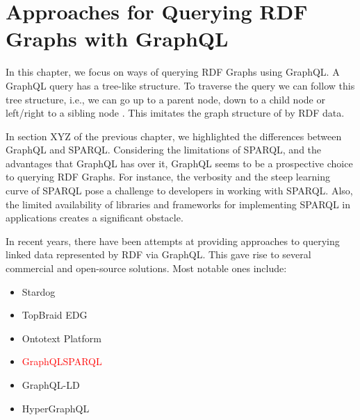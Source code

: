 \chapter{Approaches for Querying RDF Graphs with GraphQL}

In this chapter, we focus on ways of querying RDF Graphs using GraphQL. A GraphQL query has a tree-like structure. To traverse the query we can follow this tree structure, i.e., we can go up to a parent node, down to a child node or left/right to a sibling node \cite{Perez2009}. This imitates the graph structure of by RDF data.

In section XYZ of the previous chapter, we highlighted the differences between GraphQL and SPARQL. Considering the limitations of SPARQL, and the advantages that GraphQL has over it, GraphQL seems to be a prospective choice to querying RDF Graphs. For instance, the verbosity and the steep learning curve of SPARQL pose a challenge to developers in working with SPARQL. Also, the limited availability of libraries and frameworks for implementing SPARQL in applications creates a significant obstacle. 

In recent years, there have been attempts at providing approaches to querying linked data represented by RDF via GraphQL. This gave rise to several commercial and open-source solutions. Most notable ones include:

\begin{itemize}
	\item Stardog
	\item TopBraid EDG
	\item Ontotext Platform
	\item \textcolor{red}{GraphQLSPARQL} 
	\item GraphQL-LD
	\item HyperGraphQL

\end{itemize}

